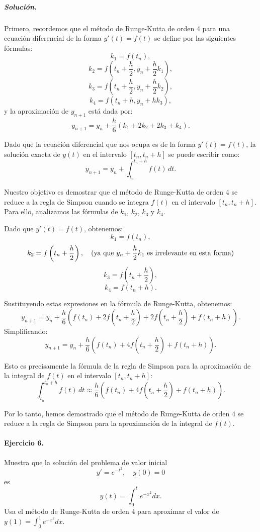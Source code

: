 \documentclass[12pt,letterpaper,oneside]{article}
\begin{document}
\subparagraph*{Solución.}
Primero, recordemos que el método de Runge-Kutta de orden 4 para una ecuación diferencial de la forma \( y'(t) = f(t) \) se define por las siguientes fórmulas:
\[
k_1 = f(t_n),
\]
\[
k_2 = f\left(t_n + \frac{h}{2}, y_n + \frac{h}{2} k_1\right),
\]
\[
k_3 = f\left(t_n + \frac{h}{2}, y_n + \frac{h}{2} k_2\right),
\]
\[
k_4 = f\left(t_n + h, y_n + h k_3\right),
\]
y la aproximación de \(y_{n+1}\) está dada por:
\[
y_{n+1} = y_n + \frac{h}{6}(k_1 + 2k_2 + 2k_3 + k_4).
\]

Dado que la ecuación diferencial que nos ocupa es de la forma \(y'(t) = f(t)\), la solución exacta de \(y(t)\) en el intervalo \([t_n, t_n + h]\) se puede escribir como:
\[
y_{n+1} = y_n + \int_{t_n}^{t_n + h} f(t) \, dt.
\]

Nuestro objetivo es demostrar que el método de Runge-Kutta de orden 4 se reduce a la regla de Simpson cuando se integra \(f(t)\) en el intervalo \([t_n, t_n + h]\). Para ello, analizamos las fórmulas de \(k_1\), \(k_2\), \(k_3\) y \(k_4\).

Dado que \(y'(t) = f(t)\), obtenemos:
\[
k_1 = f(t_n),
\]
\[
k_2 = f\left(t_n + \frac{h}{2}\right), \quad \text{(ya que \( y_n + \frac{h}{2} k_1 \) es irrelevante en esta forma)}
\]
\[
k_3 = f\left(t_n + \frac{h}{2}\right),
\]
\[
k_4 = f(t_n + h).
\]

Sustituyendo estas expresiones en la fórmula de Runge-Kutta, obtenemos:
\[
y_{n+1} = y_n + \frac{h}{6}\left(f(t_n) + 2f\left(t_n + \frac{h}{2}\right) + 2f\left(t_n + \frac{h}{2}\right) + f(t_n + h)\right).
\]
Simplificando:
\[
y_{n+1} = y_n + \frac{h}{6}\left(f(t_n) + 4f\left(t_n + \frac{h}{2}\right) + f(t_n + h)\right).
\]

Esto es precisamente la fórmula de la regla de Simpson para la aproximación de la integral de \(f(t)\) en el intervalo \([t_n, t_n + h]\):
\[
\int_{t_n}^{t_n + h} f(t) \, dt \approx \frac{h}{6} \left(f(t_n) + 4f\left(t_n + \frac{h}{2}\right) + f(t_n + h)\right).
\]

Por lo tanto, hemos demostrado que el método de Runge-Kutta de orden 4 se reduce a la regla de Simpson para la aproximación de la integral de \(f(t)\).

\paragraph*{Ejercicio 6.} Muestra que la solución del problema de valor inicial
\[
y'=e^{-t^2},\quad y(0)=0
\]
es
\[
y(t)=\int_0^te^{-x^2}dx.
\]
Usa el método de Runge-Kutta de orden 4 para aproximar el valor de $y(1)=\int_0^1e^{-x^2}dx$.
\end{document}
